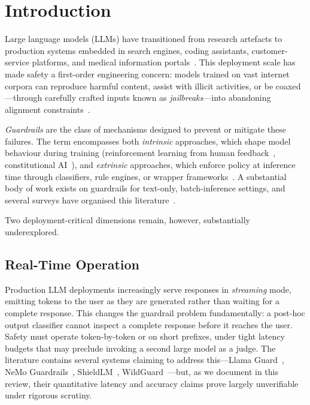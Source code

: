 \section{Introduction}
\label{sec:introduction}

Large language models (LLMs) have transitioned from research artefacts to
production systems embedded in search engines, coding assistants, customer-service
platforms, and medical information portals~\cite{bommasani2022opportunities,openai2023gpt4}.
This deployment scale has made safety a first-order engineering concern:
models trained on vast internet corpora can reproduce harmful content, assist with
illicit activities, or be coaxed—through carefully crafted inputs known as
\emph{jailbreaks}—into abandoning alignment constraints~\cite{weidinger2021ethical,perez2022red}.

\emph{Guardrails} are the class of mechanisms designed to prevent or mitigate these
failures.
The term encompasses both \emph{intrinsic} approaches, which shape model behaviour
during training (reinforcement learning from human feedback~\cite{ouyang2022training},
constitutional AI~\cite{bai2022constitutional}), and \emph{extrinsic} approaches,
which enforce policy at inference time through classifiers, rule engines, or wrapper
frameworks~\cite{inan2023llama,rebedea2023nemo}.
A substantial body of work exists on guardrails for text-only, batch-inference settings,
and several surveys have organised this literature~\cite{dong2024building}.

Two deployment-critical dimensions remain, however, substantially underexplored.

\subsection{Real-Time Operation}

Production LLM deployments increasingly serve responses in \emph{streaming} mode,
emitting tokens to the user as they are generated rather than waiting for a complete
response.
This changes the guardrail problem fundamentally: a post-hoc output classifier cannot
inspect a complete response before it reaches the user.
Safety must operate token-by-token or on short prefixes, under tight latency budgets
that may preclude invoking a second large model as a judge.
The literature contains several systems claiming to address this---Llama Guard~\cite{inan2023llama},
NeMo Guardrails~\cite{rebedea2023nemo}, ShieldLM~\cite{zhang2024shieldlm},
WildGuard~\cite{han2024wildguard}---but, as we document in this review, their quantitative
latency and accuracy claims prove largely unverifiable under rigorous scrutiny.

